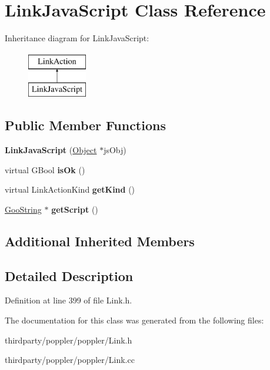 \hypertarget{class_link_java_script}{}\section{Link\+Java\+Script Class Reference}
\label{class_link_java_script}
Inheritance diagram for Link\+Java\+Script\+:\begin{figure}[H]
\begin{center}
\leavevmode
\includegraphics[height=2.000000cm]{class_link_java_script}
\end{center}
\end{figure}
\subsection*{Public Member Functions}
\begin{DoxyCompactItemize}
\item 
\mbox{\label{class_link_java_script_a9d5cf4d765f8e851423d0187f6c9ca4c}} 
{\bfseries Link\+Java\+Script} (\hyperlink{class_object}{Object} $\ast$js\+Obj)
\item 
\mbox{\label{class_link_java_script_ac22e955ec024f27f0124fd39cbbd4c02}} 
virtual G\+Bool {\bfseries is\+Ok} ()
\item 
\mbox{\label{class_link_java_script_acff07b17e8bf036338d51227338cee4d}} 
virtual Link\+Action\+Kind {\bfseries get\+Kind} ()
\item 
\mbox{\label{class_link_java_script_a42e9831838934031712d0bfcf3e3e1a6}} 
\hyperlink{class_goo_string}{Goo\+String} $\ast$ {\bfseries get\+Script} ()
\end{DoxyCompactItemize}
\subsection*{Additional Inherited Members}


\subsection{Detailed Description}


Definition at line 399 of file Link.\+h.



The documentation for this class was generated from the following files\+:\begin{DoxyCompactItemize}
\item 
thirdparty/poppler/poppler/Link.\+h\item 
thirdparty/poppler/poppler/Link.\+cc\end{DoxyCompactItemize}
